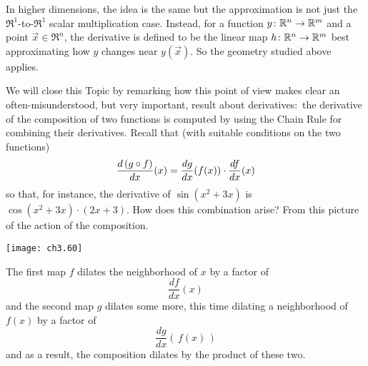 In higher dimensions, the idea is the same but the approximation
is not just the $\Re^1$-to-$\Re^1$ scalar multiplication case.
Instead, for 
a function \( \mbox{$y\colon \mathbb{R}^n\to \mathbb{R}^m$} \) and a point \( \vec{x}\in\Re^n \),
the derivative is defined to be the 
linear map \( \mbox{$h\colon \mathbb{R}^n\to \mathbb{R}^m$} \) best approximating
how \( y \) changes near \( y(\vec{x}) \).
So the geometry studied above applies.

We will close this Topic by remarking how
this point of view makes clear an often-misunderstood, but very important, 
result about derivatives:~the derivative of the composition of two functions
is computed by using the Chain Rule for combining their derivatives.
Recall that (with suitable conditions on the two functions)
\begin{equation*}
  \frac{d\,(g\mathbin\circ f)}{dx}(x) = 
  \frac{dg}{dx}(f(x))\cdot\frac{df}{dx}(x)
\end{equation*} 
so that, for instance, the derivative of $\sin(x^2+3x)$ is
$\cos(x^2+3x)\cdot(2x+3)$.
How does this combination arise?
From this picture of the action of the composition.  
\begin{center}
  \texttt{[image: ch3.60]}
\end{center}
The first map $f$ dilates the neighborhood of $x$ by a factor of 
\begin{equation*}
  \frac{df}{dx}(x) 
\end{equation*}
and the second map $g$ dilates some more, this time 
dilating a neighborhood of $f(x)$ by a factor of 
\begin{equation*}
  \frac{dg}{dx}(\,f(x)\,) 
\end{equation*}
and as a result, the composition dilates by the product of these two.

